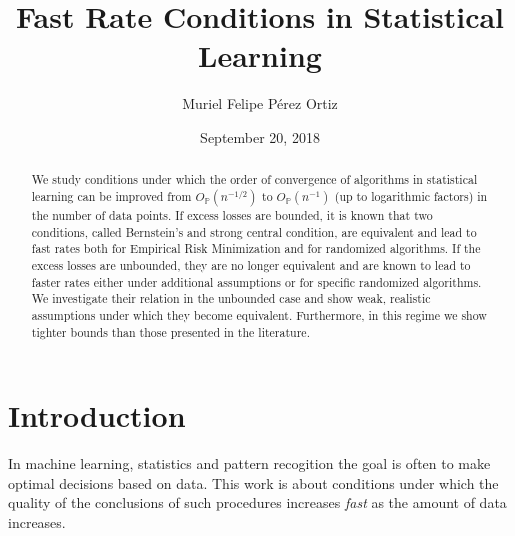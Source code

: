 \documentclass{uvamath}
\title{Fast Rate Conditions in Statistical Learning}
\author[muriel.perezortiz@student.uva.nl, 11391758]{Muriel Felipe Pérez
  Ortiz}
\date{September 20, 2018}
\newcommand*{\bbP}{\mathbb{P}}
\theoremstyle{remark}
\theoremstyle{definition}
\theoremstyle{definition}
\theoremstyle{definition}
\theoremstyle{definition}
\theoremstyle{definition}
\begin{document}
\maketitle

\begin{abstract}
  We study conditions under which the order of convergence of
  algorithms in statistical learning can be improved from
  $O_\bbP(n^{-1/2})$ to $O_{\bbP}(n^{-1})$ (up to logarithmic factors)
  in the number of data points. If excess losses are bounded, it is
  known that two conditions, called Bernstein's and strong central
  condition, are equivalent and lead to fast rates both for Empirical
  Risk Minimization and for randomized algorithms.  If the excess
  losses are unbounded, they are no longer equivalent and are known to
  lead to faster rates either under additional assumptions or for
  specific randomized algorithms. We investigate their relation in the
  unbounded case and show weak, realistic assumptions under which they
  become equivalent. Furthermore, in this regime we show tighter
  bounds than those presented in the literature.
\end{abstract}


{\hypersetup{linkcolor=black}
\tableofcontents
}

\chapter{Introduction \label{sect:introduction}}

In machine learning, statistics and pattern recogition the goal is
often to make optimal decisions based on data. This work is about
conditions under which the quality of the conclusions of such
procedures increases \textit{fast} as the amount of data increases.
\end{document}
